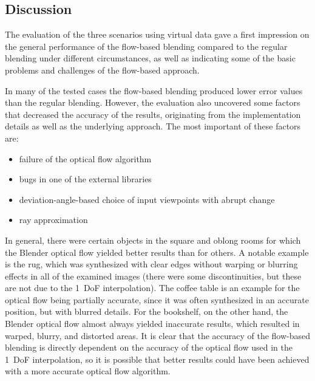 \subsection{Discussion} \label{subsec:discussion_virtual}
The evaluation of the three scenarios using virtual data gave a first impression on the general performance of the flow-based blending compared to the regular blending under different circumstances, as well as indicating some of the basic problems and challenges of the flow-based approach.


In many of the tested cases the flow-based blending produced lower error values than the regular blending. However, the evaluation also uncovered some factors that decreased the accuracy of the results, originating from the implementation details as well as the underlying approach. The most important of these factors are:

\begin{itemize}
  \item failure of the optical flow algorithm
  \item bugs in one of the external libraries
  \item deviation-angle-based choice of input viewpoints with abrupt change
  \item ray approximation
\end{itemize}


In general, there were certain objects in the square and oblong rooms for which the Blender optical flow yielded better results than for others. A notable example is the rug, which was synthesized with clear edges without warping or blurring effects in all of the examined images (there were some discontinuities, but these are not due to the 1~DoF interpolation). The coffee table is an example for the optical flow being partially accurate, since it was often synthesized in an accurate position, but with blurred details. For the bookshelf, on the other hand, the Blender optical flow almost always yielded inaccurate results, which resulted in warped, blurry, and distorted areas. It is clear that the accuracy of the flow-based blending is directly dependent on the accuracy of the optical flow used in the 1~DoF interpolation, so it is possible that better results could have been achieved with a more accurate optical flow algorithm.

